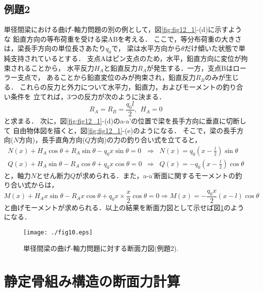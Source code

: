 ﻿\documentclass[10pt,a4j]{jbook}
\begin{document}
\subsection{例題2}
単径間梁における曲げ-軸力問題の別の例として，図\ref{fig:fig12_1}-(d)に示すような
鉛直方向の等布荷重を受ける梁ABを考える．
ここで，等分布荷重の大きさは，梁長手方向の単位長さあたり$q_0$で，
梁は水平方向から$\theta$だけ傾いた状態で単純支持されているとする．
支点Aはピン支点のため，水平，鉛直方向に変位が拘束されることから，
水平反力$H_A$と鉛直反力$R_A$が発生する．一方，支点Bはローラー支点で，
あることから鉛直変位のみが拘束され，鉛直反力$R_B$のみが生じる．
これらの反力と外力について水平力，鉛直力，およびモーメントの釣り合い条件を
立てれば，3つの反力が次のように決まる．
\begin{equation}
	R_A=R_B=\frac{q_0l}{2}, \ \ H_A=0
\end{equation}
と求まる．
次に，図\ref{fig:fig12_1}-(d)のa-a'の位置で梁を長手方向に垂直に切断して
自由物体図を描くと，図\ref{fig:fig12_1}-(e)のようになる．
そこで，梁の長手方向($N$方向)，長手直角方向($Q$方向)の力の釣り合い式を立てると，
\begin{eqnarray}
	N(x)+H_A\cos\theta +R_A\sin\theta - q_0x\sin \theta =0 
	& \Rightarrow  & 
	N(x)=q_0\left(x-\frac{l}{2}\right)\sin\theta
	\\
	Q(x)+H_A\sin\theta -R_A\cos\theta +q_0x\cos \theta =0 
	& \Rightarrow  &  
	Q(x)=-q_0\left(x-\frac{l}{2}\right) \cos\theta	
\end{eqnarray}
と，軸力$N$とせん断力$Q$が求められる．また，a-a'断面に関するモーメントの釣り合い式からは，
\begin{equation}
	M(x)+H_Ax\sin\theta -R_Ax\cos\theta +q_0x\times \frac{x}{2}\cos \theta =0 
	\Rightarrow    
	M(x)=-\frac{q_0x}{2}\left(x-l\right)\cos\theta
\end{equation}
と曲げモーメントが求められる．以上の結果を断面力図として示せば図\ref{fig:fig12_1_2}のようになる．
\begin{figure}[h]
	\begin{center}
	\texttt{[image: ./fig10.eps]} 
	\end{center}
	\caption{
		単径間梁の曲げ-軸力問題に対する断面力図(例題2).
	} 
	\label{fig:fig12_1_2}
\end{figure}
\section{静定骨組み構造の断面力計算}
\end{document}
